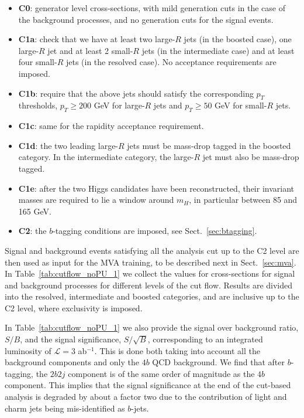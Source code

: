     \begin{itemize}
    \item {\bf C0}:  generator level cross-sections, with
      mild generation cuts in the case of the background processes, and no
      generation cuts
      for the signal events.
    \item {\bf C1a}:  check that we have at least
      two large-$R$ jets (in the boosted case),
      one large-$R$ jet and at least 2 small-$R$ jets (in the intermediate
      case) and at least four small-$R$ jets (in the resolved case).
      No acceptance requirements are imposed.
    \item {\bf C1b}: require that the above jets should
      satisfy the corresponding $p_T$ thresholds,
      $p_T \ge 200$ GeV for large-$R$ jets and
      $p_T \ge 50$ GeV for small-$R$ jets.
    \item {\bf C1c}: same for the
      rapidity acceptance requirement.
    \item {\bf C1d}: the two leading large-$R$ jets must
      be mass-drop tagged in the boosted category.
      In the intermediate category, the large-$R$ jet must also be mass-drop tagged.
    \item {\bf C1e}: after the two Higgs candidates  have been reconstructed,
      their invariant masses are required to lie a window around $m_H$,
      in particular between 85 and 165 GeV.
          \item {\bf C2}: the
            $b$-tagging conditions are
            imposed, see
            Sect.~\ref{sec:btagging}.
      \end{itemize}
    Signal and background events satisfying all the analysis cut up to the
    C2 level
    are then used as input for the MVA training, to be described next
    in Sect.~\ref{sec:mva}.
    In Table~\ref{tab:cutflow_noPU_1} we collect
    the values for cross-sections for signal and background processes
    for different levels of the cut flow.
    Results are divided into the resolved, intermediate and boosted categories,
    and are inclusive up to the C2 level, where exclusivity is imposed.

In Table~\ref{tab:cutflow_noPU_1} we also  provide the signal over
      background ratio, $S/B$, and the signal
      significance, $S/\sqrt{B}$, corresponding to an integrated
      luminosity of $\mathcal{L}=3$ ab$^{-1}$.
      This is done both taking into account all the background components and only
      the $4b$ QCD background.
      We find that after $b$-tagging, the  $2b2j$ component is
      of the same order of magnitude as the $4b$ component.
      This implies that the signal significance at the end of the cut-based
      analysis is degraded by about a factor two due to the contribution
      of light and charm jets being mis-identified as $b$-jets.
    

